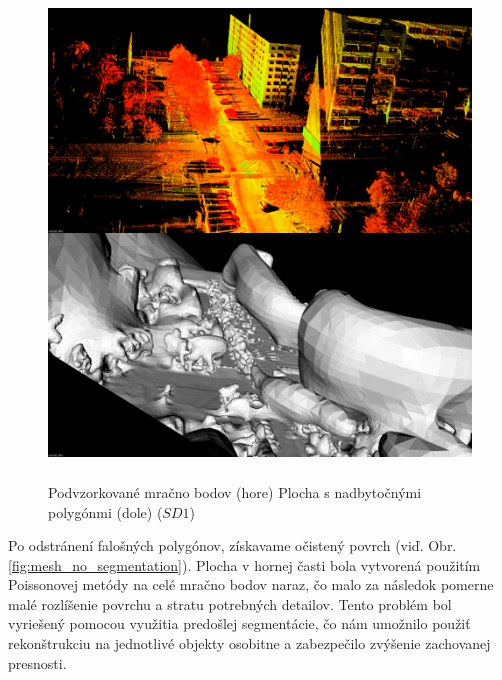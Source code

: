 \begin{figure}[!htbp]
  \centering
  \includegraphics[width=16cm, height=13cm]{img/mesh_bad_polygons.png}
  \caption{Podvzorkované mračno bodov (hore) Plocha s nadbytočnými polygónmi (dole) ($SD1$)} 
  \label{fig:mesh_bad_polygons}
\end{figure} 

\indent Po odstránení falošných polygónov, získavame očistený povrch (viď. Obr. \ref{fig:mesh_no_segmentation}). Plocha v hornej časti bola vytvorená použitím Poissonovej metódy na celé mračno bodov naraz, čo malo za následok pomerne malé rozlíšenie povrchu a stratu potrebných detailov. Tento problém bol vyriešený pomocou využitia predošlej segmentácie, čo nám umožnilo použiť rekonštrukciu na jednotlivé objekty osobitne a zabezpečilo zvýšenie zachovanej presnosti.

